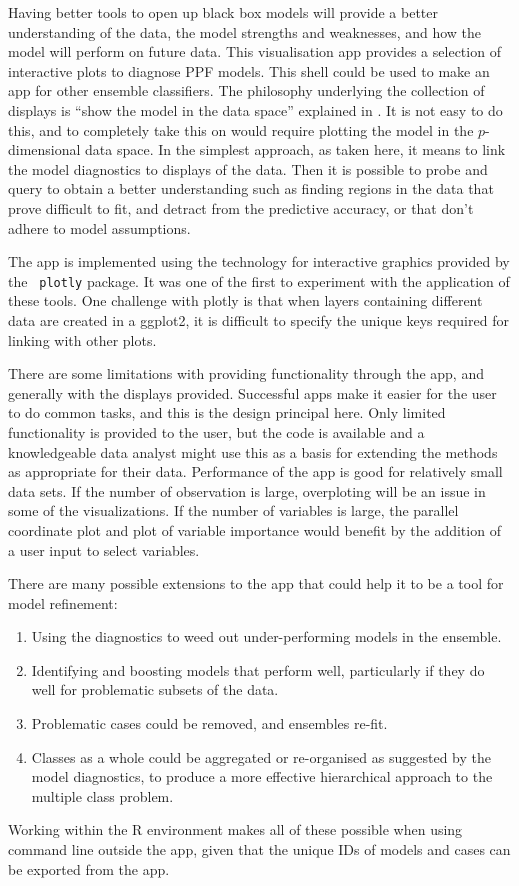 \documentclass[smallextended,natbib]{svjour3}\usepackage[]{graphicx}\usepackage[]{xcolor}
\begin{document}
Having better tools to open up black box models will provide a better understanding of the data, the model strengths and weaknesses, and how the model will perform on future data. This visualisation app provides a selection of interactive plots to diagnose PPF models. This shell could be used to make an app for other ensemble classifiers. The philosophy underlying the collection of displays is ``show the model in the data space''  explained in \citet{wickham2015visualizing}. It is not easy to do this, and to completely take this on would require plotting the model in the $p$-dimensional data space. In the simplest approach, as taken here, it means to link the model diagnostics to displays of the data. Then it is possible to probe and query to obtain a better understanding such as finding regions in the data that prove difficult to fit, and detract from the predictive accuracy, or that don't adhere to model assumptions.

The app is implemented using the technology for interactive graphics provided by the \verb# plotly# package. It was one of the first to experiment with the application of these tools. One challenge with plotly is that  when layers containing different data are created in a ggplot2, it is difficult to specify the unique keys required for linking with other plots.

There are some limitations with providing functionality through the app, and generally with the displays provided. Successful apps make it easier for the user to do common tasks, and this is the design principal here. Only limited functionality is provided to the user, but the code is available and a knowledgeable data analyst might use this as a basis for extending the methods as appropriate for their data. Performance of the app is good for relatively small data sets. If the number of observation is large, overploting will be an issue in some of the visualizations. If the number of variables is large, the parallel coordinate plot and plot of variable importance would benefit by the addition of a user input to select variables.

There are many possible extensions to the app that could help it to be a tool for model refinement:

\begin{enumerate}
\item Using the diagnostics to weed out under-performing models in the ensemble. 
\item Identifying and boosting models that perform well, particularly if they do well for problematic subsets of the data.
\item Problematic cases could be removed, and ensembles re-fit. 
\item Classes as a whole could be aggregated or re-organised as suggested by the model diagnostics, to produce a more effective hierarchical approach to the multiple class problem. 
\end{enumerate}
\noindent Working within the R environment makes all of these possible when using command line outside the app, given that the unique IDs of models and cases can be exported from the app.
\end{document}
